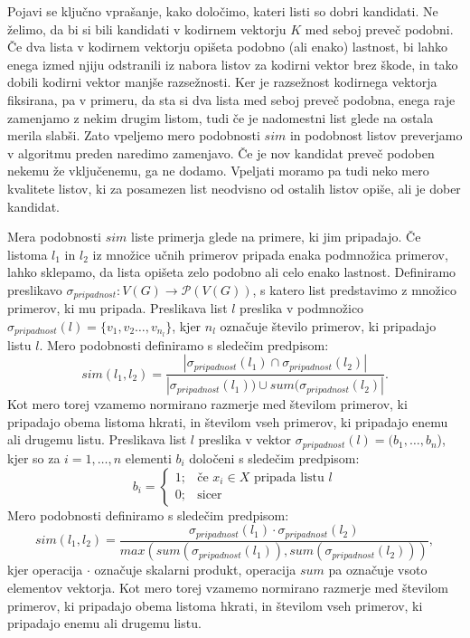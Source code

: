 \documentclass[12pt,a4paper]{article}
\begin{document}
Pojavi se ključno vprašanje, kako določimo, kateri listi so dobri kandidati. Ne želimo, da bi si bili kandidati v kodirnem vektorju $K$ med seboj preveč podobni. 
Če dva lista v kodirnem vektorju opišeta podobno (ali enako) lastnost, bi lahko enega izmed njiju odstranili iz nabora listov za kodirni vektor brez škode, in tako dobili kodirni vektor manjše razsežnosti. 
Ker je razsežnost kodirnega vektorja fiksirana, pa v primeru, da sta si dva lista med seboj preveč podobna, enega raje zamenjamo z nekim drugim listom, tudi če je nadomestni list glede na ostala merila slabši.
Zato vpeljemo mero podobnosti $sim$ in podobnost listov preverjamo v algoritmu preden naredimo zamenjavo. Če je nov kandidat preveč podoben nekemu že vključenemu, ga ne dodamo.
Vpeljati moramo pa tudi neko mero kvalitete listov, ki za posamezen list neodvisno od ostalih listov opiše, ali je dober kandidat.

Mera podobnosti $sim$ liste primerja glede na primere, ki jim pripadajo. 
Če listoma $l_1$ in $l_2$ iz množice učnih primerov pripada enaka podmnožica primerov, lahko sklepamo, da lista opišeta zelo podobno ali celo enako lastnost.
Definiramo preslikavo $\sigma_{\mathit{pripadnost}}: V(G) \rightarrow \mathcal{P}(V(G))$, s katero list predstavimo z množico primerov, ki mu pripada.
Preslikava list $l$ preslika v podmnožico $\sigma_{\mathit{pripadnost}}(l) = \{v_1,v_2\ldots,v_{n_l}\}$, kjer $n_l$ označuje število primerov, ki pripadajo listu $l$.
Mero podobnosti definiramo s sledečim predpisom:
\[
	sim(l_1, l_2) = \frac{|\sigma_{pripadnost}(l_1) \cap \sigma_{pripadnost}(l_2)|}{|\sigma_{pripadnost}(l_1)) \cup sum(\sigma_{pripadnost}(l_2)|}.
\]
Kot mero torej vzamemo normirano razmerje med številom primerov, ki pripadajo obema listoma hkrati, in številom vseh primerov, ki pripadajo enemu ali drugemu listu.
Preslikava list $l$ preslika v vektor $\sigma_{pripadnost}(l) = (b_1,\ldots, b_n$), kjer so za $i=1,\ldots,n$ elementi $b_i$ določeni s sledečim predpisom:
$$
b_i =
\begin{cases}
	1 ;& \text{če $x_i \in X$ pripada listu $l$} \\
	0 ;& \text{sicer}
\end{cases}
$$
Mero podobnosti definiramo s sledečim predpisom:
$$
sim(l_1, l_2) = \frac{\sigma_{pripadnost}(l_1) \cdot \sigma_{pripadnost}(l_2)}{max(sum(\sigma_{pripadnost}(l_1)), sum(\sigma_{pripadnost}(l_2)))},
$$
kjer operacija $\cdot$ označuje skalarni produkt, operacija $sum$ pa označuje vsoto elementov vektorja.
Kot mero torej vzamemo normirano razmerje med številom primerov, ki pripadajo obema listoma hkrati, in številom vseh primerov, ki pripadajo enemu ali drugemu listu.
\end{document}
